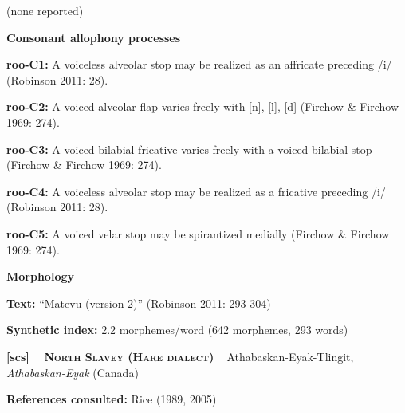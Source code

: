 \begin{styleBody}
(none reported)
\end{styleBody}

\begin{styleBody}
\textbf{Consonant allophony processes}
\end{styleBody}

\begin{styleBody}
\textbf{roo-C1: }A voiceless alveolar stop may be realized as an affricate preceding /i/ (Robinson 2011: 28).
\end{styleBody}

\begin{styleBody}
\textbf{roo-C2: }A voiced alveolar flap varies freely with [n], [l], [d] (Firchow \& Firchow 1969: 274).
\end{styleBody}

\begin{styleBody}
\textbf{roo-C3: }A voiced bilabial fricative varies freely with a voiced bilabial stop (Firchow \& Firchow 1969: 274).
\end{styleBody}

\begin{styleBody}
\textbf{roo-C4: }A voiceless alveolar stop may be realized as a fricative preceding /i/ (Robinson 2011: 28).
\end{styleBody}

\begin{styleBody}
\textbf{roo-C5: }A voiced velar stop may be spirantized medially (Firchow \& Firchow 1969: 274).
\end{styleBody}

\begin{styleBody}
\textbf{Morphology}
\end{styleBody}

\begin{styleBody}
\textbf{Text:} “Matevu (version 2)” (Robinson 2011: 293-304)
\end{styleBody}

\begin{styleBody}
\textbf{Synthetic index: }2.2 morphemes/word (642 morphemes, 293 words)
\end{styleBody}

\clearpage\begin{styleBody}
\textbf{[scs] }\ \ \textbf{\textsc{North Slavey (Hare dialect)}}\textbf{\ \ }Athabaskan-Eyak-Tlingit, \textit{Athabaskan-Eyak} (Canada)
\end{styleBody}

\begin{styleBody}
\textbf{References consulted: }Rice (1989, 2005)
\end{styleBody}

